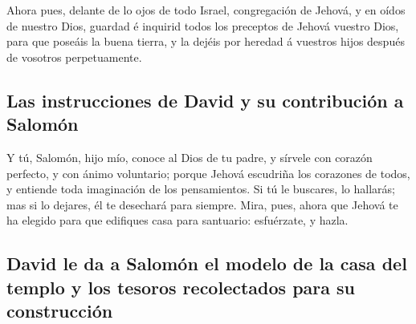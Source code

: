  Ahora pues, delante de lo ojos de todo Israel, congregación
de Jehová, y en oídos de nuestro Dios, guardad é inquirid todos los
preceptos de Jehová vuestro Dios, para que poseáis la buena tierra, y la
dejéis por heredad á vuestros hijos después de vosotros perpetuamente.

\hypertarget{las-instrucciones-de-david-y-su-contribuciuxf3n-a-salomuxf3n}{%
\subsection{Las instrucciones de David y su contribución a
Salomón}\label{las-instrucciones-de-david-y-su-contribuciuxf3n-a-salomuxf3n}}

 Y tú, Salomón, hijo mío, conoce al Dios de tu padre, y
sírvele con corazón perfecto, y con ánimo voluntario; porque Jehová
escudriña los corazones de todos, y entiende toda imaginación de los
pensamientos. Si tú le buscares, lo hallarás; mas si lo dejares, él te
desechará para siempre.  Mira, pues, ahora que Jehová te ha
elegido para que edifiques casa para santuario: esfuérzate, y hazla.

\hypertarget{david-le-da-a-salomuxf3n-el-modelo-de-la-casa-del-templo-y-los-tesoros-recolectados-para-su-construcciuxf3n}{%
\subsection{David le da a Salomón el modelo de la casa del templo y los
tesoros recolectados para su
construcción}\label{david-le-da-a-salomuxf3n-el-modelo-de-la-casa-del-templo-y-los-tesoros-recolectados-para-su-construcciuxf3n}}

